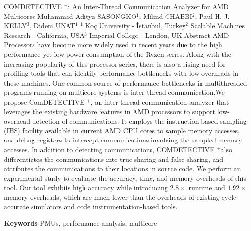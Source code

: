 
    \begin{abstract_online}{COMDETECTIVE $^{+}$: An Inter-Thread Communication Analyzer for AMD Multicores}{%
        Muhammad Aditya SASONGKO$^{1}$, Milind CHABBI$^{2}$, Paul H. J. KELLY$^{3}$, Didem UNAT$^{1}$}{%
        }{%
        $^1$ Koç University - İstanbul, Turkey\newline{}$^2$ Scalable Machines Research - California, USA\newline{}$^3$ Imperial College - London, UK}
    Abstract-AMD Processors have become more widely used in recent years due to the high performance yet low power consumption of the Ryzen series. Along with the increasing popularity of this processor series, there is also a rising need for profiling tools that can identify performance bottlenecks with low overheads in these machines. One common source of performance bottlenecks in multithreaded programs running on multicore systems is inter-thread communication.\newline We propose ComDETECTIVE ${ }^{+}$, an inter-thread communication analyzer that leverages the existing hardware features in AMD processors to support low-overhead detection of communications. It employs the instruction-based sampling (IBS) facility available in current AMD CPU cores to sample memory accesses, and debug registers to intercept communications involving the sampled memory accesses. In addition to detecting communications, COMDETECTIVE ${ }^{+}$also differentiates the communications into true sharing and false sharing, and attributes the communications to their locations in source code. We perform an experimental study to evaluate the accuracy, time, and memory overheads of this tool. Our tool exhibits high accuracy while introducing $2.8 \times$ runtime and $1.92 \times$ memory overheads, which are much lower than the overheads of existing cycle-accurate simulators and code instrumentation-based tools. 
    
        \textbf{Keywords} \newline{}PMUs, performance analysis, multicore
    \end{abstract_online}
    